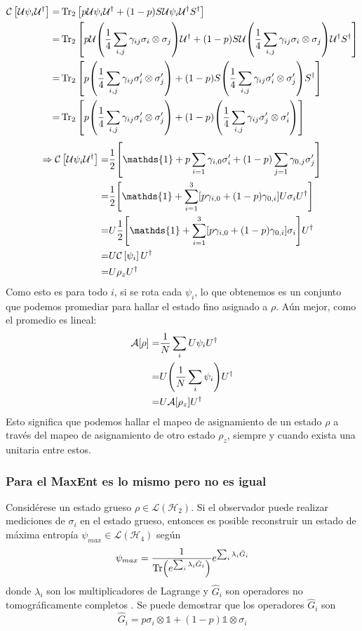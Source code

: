 \documentclass[onecolumn,11pt]{article}
\newcommand{\mcU}{\mathcal{U}}
\newcommand{\mcL}{\mathcal{L}}
\newcommand{\mcH}{\mathcal{H}}
\newcommand{\mcC}{\mathcal{C}}
\newcommand{\mcA}{\mathcal{A}}
\newcommand{\Id}{\mathds{1}}%
\newcommand{\CG}[1]{\mcC\left[#1\right]}
\begin{document}
\begin{align*}
\CG{\mcU \psi_{i} \mcU^{\dag}}=&\Tr_{2}\qty[p\mcU\psi_{i}\mcU^{\dag}+(1-p)S\mcU \psi_{i} \mcU^{\dag}S^{\dag}]\\
=&\Tr_{2}\qty[p\mcU\qty(\frac{1}{4}\sum_{i,j}\gamma_{ij} \sigma_i\otimes\sigma_j)\mcU^{\dag}+(1-p) S\mcU \qty(\frac{1}{4}\sum_{i,j}\gamma_{ij} \sigma_i\otimes\sigma_j) \mcU^{\dag} S^{\dag}]\\
=&\Tr_{2}\qty[p\qty(\frac{1}{4}\sum_{i,j}\gamma_{ij} \sigma_{i}'\otimes\sigma_{j}')+(1-p)S \qty(\frac{1}{4}\sum_{i,j}\gamma_{ij} \sigma_{i}'\otimes\sigma_{j}')S^{\dag}]\\
=&\Tr_{2}\qty[p\qty(\frac{1}{4}\sum_{i,j}\gamma_{ij} \sigma_{i}'\otimes\sigma_{j}')+(1-p)\qty(\frac{1}{4}\sum_{i,j}\gamma_{ij} \sigma_{j}'\otimes\sigma_{i}')]\\
\end{align*}
\begin{align*}
\Rightarrow\CG{\mcU \psi_{i} \mcU^{\dag}}=&\frac{1}{2}\qty[\Id +p\sum_{i=1}\gamma_{i,0}\sigma_{i}'+(1-p)\sum_{j=1}\gamma_{0,j}\sigma_{j}']\\
=&\frac{1}{2}\qty[\Id + \sum_{i=1}^3[p\gamma_{i,0}+(1-p)\gamma_{0,i}]U\sigma_{i}U^{\dag}]\\
=&U\frac{1}{2}\qty[\Id + \sum_{i=1}^3[p\gamma_{i,0}+(1-p)\gamma_{0,i}]\sigma_{i}]U^{\dag}\\
=&U\CG{\psi_{i}}U^{\dag}\\
=&U\rho_{z}U^{\dag}\\
\end{align*}
Como esto es para todo $i$, si se rota cada $\psi_{i}$, lo que obtenemos es un conjunto que podemos promediar para hallar el estado fino asignado a $\rho$. Aún mejor, como el promedio es lineal:
\begin{align}
\mcA[\rho]=&\frac{1}{N}\sum_{i}U\psi_{i}U^{\dag}\\
=&U\qty(\frac{1}{N}\sum_{i}\psi_{i})U^{\dag}\\
=&U\mcA[\rho_{z}]U^{\dag}
\end{align}
Esto significa que podemos hallar el mapeo de asignamiento de un estado $\rho$ a través del mapeo de asignamiento de otro estado $\rho_{z}$, siempre y cuando exista una unitaria entre estos.
\subsubsection{Para el MaxEnt es lo mismo pero no es igual}
Considérese un estado grueso $\rho\in\mcL(\mcH_{2})$. Si el observador puede realizar mediciones de $\sigma_{i}$ en el estado grueso, entonces es posible reconstruir un estado de máxima entropía $\psi_{max}\in\mcL(\mcH_{4})$ según
\begin{equation}\label{eq:MaxEnt}
\psi_{max}=\frac{1}{\Tr(e^{\sum_{i}\lambda_{i}\hat{G}_{i}})}e^{\sum_{i}\lambda_{i}\hat{G}_{i}}
\end{equation}
donde $\lambda_{i}$ son los multiplicadores de Lagrange y $\hat{G}_{i}$ son operadores no tomográficamente completos \cite{MaxEnt}. Se puede demostrar que los operadores $\hat{G}_{i}$ son
\begin{equation}\label{eq:Gop}
\hat{G}_{i}=p\sigma_{i}\otimes\Id+(1-p)\Id\otimes\sigma_{i}
\end{equation}
\end{document}
